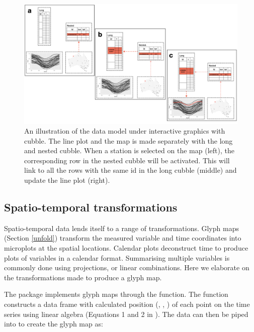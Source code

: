 \documentclass[
]{jss}
\begin{document}
\begin{CodeChunk}
\begin{figure}

{\centering \includegraphics[width=1\linewidth,height=0.4\textheight]{../figures/diagram-keynotes/diagram-keynotes.003} 

}

\caption[An illustration of the data model under interactive graphics with cubble]{An illustration of the data model under interactive graphics with cubble. The line plot and the map is made separately with the long and nested cubble. When a station is selected on the map (left), the corresponding row in the nested cubble will be activated. This will link to all the rows with the same id in the long cubble (middle) and update the line plot (right).}\label{fig:illu-interactive}
\end{figure}
\end{CodeChunk}

\hypertarget{st_transformation}{%
\subsection{Spatio-temporal transformations}\label{st_transformation}}

Spatio-temporal data lends itself to a range of transformations. Glyph maps (Section \ref{unfold}) transform the measured variable and time coordinates into microplots at the spatial locations. Calendar plots \citep{wang2020calendar} deconstruct time to produce plots of variables in a calendar format. Summarising multiple variables is commonly done using projections, or linear combinations. Here we elaborate on the transformations made to produce a glyph map.

The  package  implements glyph maps through the  function. The function constructs a data frame with calculated position (, , ) of each point on the time series using linear algebra (Equations 1 and 2 in \citet{Wickham2012-yr}). The data can then be piped into  to create the glyph map as:
\end{document}
